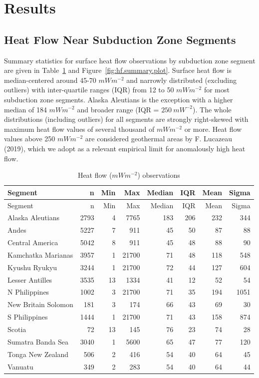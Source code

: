 \documentclass[draft,linenumbers]{agujournal2018}
\begin{document}
\section{Results}

\subsection{Heat Flow Near Subduction Zone Segments}

Summary statistics for surface heat flow observations by subduction zone
segment are given in Table~\ref{tbl:hf.summary.table} and
Figure~\ref{fig:hf.summary.plot}. Surface heat flow is median-centered
around 45-70 \(mWm^{-2}\) and narrowly distributed (excluding outliers)
with inter-quartile ranges (IQR) from 12 to 50 \(mWm^{-2}\) for most
subduction zone segments. Alaska Aleutians is the exception with a
higher median of 184 \(mWm^{-2}\) and broader range (IQR =
\(250~mW^{-2}\)). The whole distributions (including outliers) for all
segments are strongly right-skewed with maximum heat flow values of
several thousand of \(mWm^{-2}\) or more. Heat flow values above 250
\(mWm^{-2}\) are considered geothermal areas by F. Lucazeau (2019),
which we adopt as a relevant empirical limit for anomalously high heat
flow.

\hypertarget{tbl:hf.summary.table}{}
\begin{longtable}[]{@{}lrrrrrrr@{}}
\caption{\label{tbl:hf.summary.table}Heat flow (\(mWm^{-2}\))
observations}\tabularnewline
\toprule
Segment & n & Min & Max & Median & IQR & Mean & Sigma \\
\midrule
\endfirsthead
\toprule
Segment & n & Min & Max & Median & IQR & Mean & Sigma \\
\midrule
\endhead
Alaska Aleutians & 2793 & 4 & 7765 & 183 & 206 & 232 & 344 \\
Andes & 5227 & 7 & 911 & 45 & 50 & 87 & 88 \\
Central America & 5042 & 8 & 911 & 45 & 48 & 88 & 90 \\
Kamchatka Marianas & 3957 & 1 & 21700 & 71 & 48 & 118 & 548 \\
Kyushu Ryukyu & 3244 & 1 & 21700 & 72 & 44 & 127 & 604 \\
Lesser Antilles & 3535 & 13 & 1334 & 41 & 12 & 52 & 54 \\
N Philippines & 1002 & 3 & 21700 & 71 & 35 & 194 & 1051 \\
New Britain Solomon & 181 & 3 & 174 & 66 & 43 & 69 & 30 \\
S Philippines & 1444 & 1 & 21700 & 71 & 43 & 158 & 874 \\
Scotia & 72 & 13 & 145 & 76 & 23 & 74 & 28 \\
Sumatra Banda Sea & 3040 & 1 & 5600 & 65 & 47 & 77 & 120 \\
Tonga New Zealand & 506 & 2 & 416 & 54 & 40 & 64 & 45 \\
Vanuatu & 349 & 2 & 283 & 54 & 40 & 64 & 44 \\
\bottomrule
\end{longtable}
\end{document}
